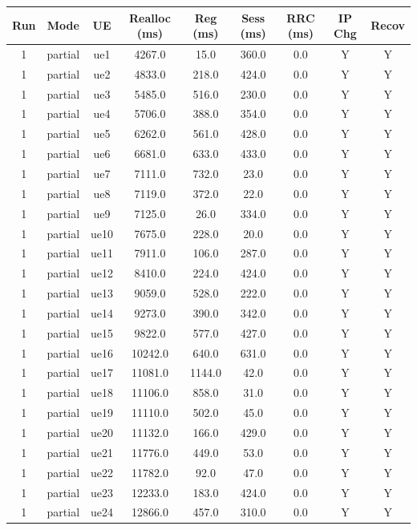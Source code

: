 \begin{table}[ht]
\centering
\begin{tabular}{|c|c|c|c|c|c|c|c|c|}
\hline
Run & Mode & UE & Realloc (ms) & Reg (ms) & Sess (ms) & RRC (ms) & IP Chg & Recov \\
\hline
1 & partial & ue1 & 4267.0 & 15.0 & 360.0 & 0.0 & Y & Y \\
1 & partial & ue2 & 4833.0 & 218.0 & 424.0 & 0.0 & Y & Y \\
1 & partial & ue3 & 5485.0 & 516.0 & 230.0 & 0.0 & Y & Y \\
1 & partial & ue4 & 5706.0 & 388.0 & 354.0 & 0.0 & Y & Y \\
1 & partial & ue5 & 6262.0 & 561.0 & 428.0 & 0.0 & Y & Y \\
1 & partial & ue6 & 6681.0 & 633.0 & 433.0 & 0.0 & Y & Y \\
1 & partial & ue7 & 7111.0 & 732.0 & 23.0 & 0.0 & Y & Y \\
1 & partial & ue8 & 7119.0 & 372.0 & 22.0 & 0.0 & Y & Y \\
1 & partial & ue9 & 7125.0 & 26.0 & 334.0 & 0.0 & Y & Y \\
1 & partial & ue10 & 7675.0 & 228.0 & 20.0 & 0.0 & Y & Y \\
1 & partial & ue11 & 7911.0 & 106.0 & 287.0 & 0.0 & Y & Y \\
1 & partial & ue12 & 8410.0 & 224.0 & 424.0 & 0.0 & Y & Y \\
1 & partial & ue13 & 9059.0 & 528.0 & 222.0 & 0.0 & Y & Y \\
1 & partial & ue14 & 9273.0 & 390.0 & 342.0 & 0.0 & Y & Y \\
1 & partial & ue15 & 9822.0 & 577.0 & 427.0 & 0.0 & Y & Y \\
1 & partial & ue16 & 10242.0 & 640.0 & 631.0 & 0.0 & Y & Y \\
1 & partial & ue17 & 11081.0 & 1144.0 & 42.0 & 0.0 & Y & Y \\
1 & partial & ue18 & 11106.0 & 858.0 & 31.0 & 0.0 & Y & Y \\
1 & partial & ue19 & 11110.0 & 502.0 & 45.0 & 0.0 & Y & Y \\
1 & partial & ue20 & 11132.0 & 166.0 & 429.0 & 0.0 & Y & Y \\
1 & partial & ue21 & 11776.0 & 449.0 & 53.0 & 0.0 & Y & Y \\
1 & partial & ue22 & 11782.0 & 92.0 & 47.0 & 0.0 & Y & Y \\
1 & partial & ue23 & 12233.0 & 183.0 & 424.0 & 0.0 & Y & Y \\
1 & partial & ue24 & 12866.0 & 457.0 & 310.0 & 0.0 & Y & Y \\

\end{tabular}
\end{table}
